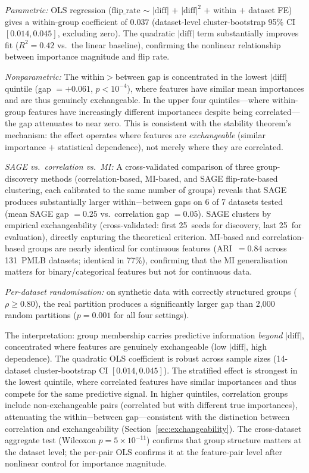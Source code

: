 \documentclass[11pt,a4paper]{article}
\begin{document}
\emph{Parametric:} OLS regression (flip$\_$rate $\sim$ $|\text{diff}|$ $+$ $|\text{diff}|^2$ $+$ within $+$ dataset FE) gives a within-group coefficient of $0.037$ (dataset-level cluster-bootstrap 95\% CI $[0.014, 0.045]$, excluding zero).  The quadratic $|\text{diff}|$ term substantially improves fit ($R^2 = 0.42$ vs.\ the linear baseline), confirming the nonlinear relationship between importance magnitude and flip rate.

\emph{Nonparametric:} The within$>$between gap is concentrated in the lowest $|\text{diff}|$ quintile (gap $= +0.061$, $p < 10^{-4}$), where features have similar mean importances and are thus genuinely exchangeable.  In the upper four quintiles---where within-group features have increasingly different importances despite being correlated---the gap attenuates to near zero.  This is consistent with the stability theorem's mechanism: the effect operates where features are \emph{exchangeable} (similar importance $+$ statistical dependence), not merely where they are correlated.

\emph{SAGE vs.\ correlation vs.\ MI:} A cross-validated comparison of three group-discovery methods (correlation-based, MI-based, and SAGE flip-rate-based clustering, each calibrated to the same number of groups) reveals that SAGE produces substantially larger within$-$between gaps on 6 of 7 datasets tested (mean SAGE gap $= 0.25$ vs.\ correlation gap $= 0.05$).  SAGE clusters by empirical exchangeability (cross-validated: first 25~seeds for discovery, last 25~for evaluation), directly capturing the theoretical criterion.  MI-based and correlation-based groups are nearly identical for continuous features (ARI~$= 0.84$ across 131~PMLB datasets; identical in 77\%), confirming that the MI generalisation matters for binary/categorical features but not for continuous data.

\emph{Per-dataset randomisation:} on synthetic data with correctly structured groups ($\rho \geq 0.80$), the real partition produces a significantly larger gap than 2{,}000 random partitions ($p = 0.001$ for all four settings).

The interpretation: group membership carries predictive information \emph{beyond} $|\text{diff}|$, concentrated where features are genuinely exchangeable (low $|\text{diff}|$, high dependence).  The quadratic OLS coefficient is robust across sample sizes (14-dataset cluster-bootstrap CI $[0.014, 0.045]$).  The stratified effect is strongest in the lowest quintile, where correlated features have similar importances and thus compete for the same predictive signal.  In higher quintiles, correlation groups include non-exchangeable pairs (correlated but with different true importances), attenuating the within$-$between gap---consistent with the distinction between correlation and exchangeability (Section~\ref{sec:exchangeability}).  The cross-dataset aggregate test (Wilcoxon $p = 5 \times 10^{-11}$) confirms that group structure matters at the dataset level; the per-pair OLS confirms it at the feature-pair level after nonlinear control for importance magnitude.
\end{document}
